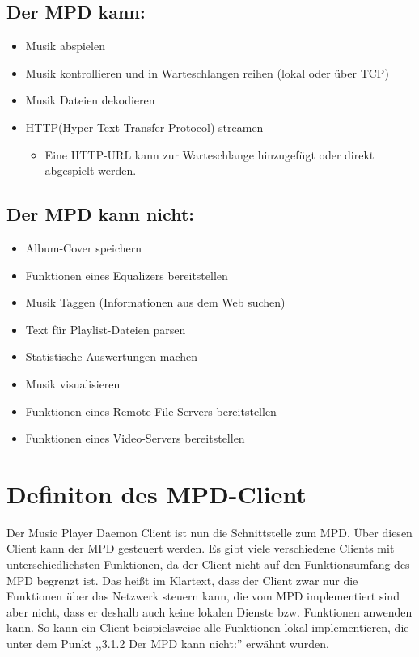 \newpage
\subsection{Der MPD kann:}

\renewcommand{\labelitemi}{•}
\begin{itemize}
	\item Musik abspielen
	\item Musik kontrollieren und in Warteschlangen reihen (lokal oder über TCP)
	\item Musik Dateien dekodieren
	\item HTTP(Hyper Text Transfer Protocol) streamen
	
	\renewcommand{\labelitemi}{--}
	\begin{itemize}
		\item Eine HTTP-URL kann zur Warteschlange hinzugefügt oder direkt abgespielt werden.\\
	\end{itemize}
\end{itemize}

\subsection{Der MPD kann nicht:}

\renewcommand{\labelitemi}{•}
\begin{itemize}
	\item Album-Cover speichern
	\item Funktionen eines Equalizers bereitstellen
	\item Musik Taggen (Informationen aus dem Web suchen)
	\item Text für Playlist-Dateien parsen
	\item Statistische Auswertungen machen
	\item Musik visualisieren
	\item Funktionen eines Remote-File-Servers bereitstellen
	\item Funktionen eines Video-Servers bereitstellen
\end{itemize}

\section{Definiton des MPD-Client}
Der Music Player Daemon Client ist nun die Schnittstelle zum MPD. Über diesen Client kann der MPD gesteuert werden. Es gibt viele verschiedene Clients mit unterschiedlichsten Funktionen, da der Client nicht auf den Funktionsumfang des MPD begrenzt ist. Das heißt im Klartext, dass der Client zwar nur die Funktionen über das Netzwerk steuern kann, die vom MPD implementiert sind aber nicht, dass er deshalb auch keine lokalen Dienste bzw. Funktionen anwenden kann. So kann ein Client beispielsweise alle Funktionen lokal implementieren, die unter dem Punkt ,,3.1.2 Der MPD kann nicht:'' erwähnt wurden.

